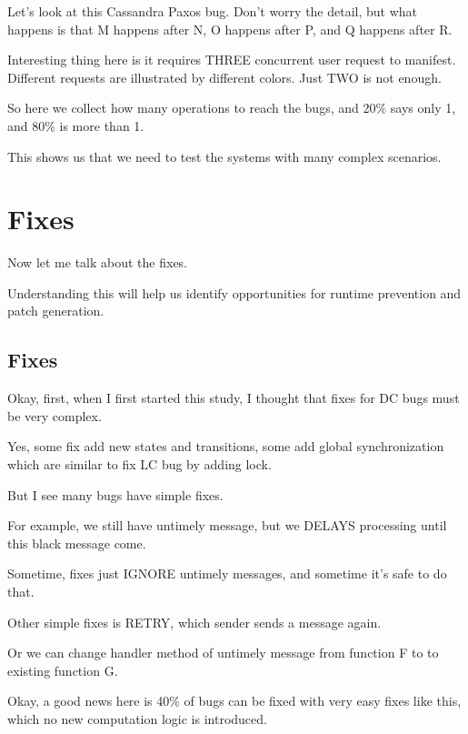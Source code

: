 
Let's look at this Cassandra Paxos bug. Don't worry the detail, but what happens
is that M happens after N, O happens after P, and Q happens after R.

Interesting thing here is it requires THREE concurrent user request to manifest.
Different requests are illustrated by different colors. Just TWO is not enough. 

So here we collect how many operations to reach the bugs, and 20\% says only 1,
and 80\% is more than 1.


This shows us that we need to test the systems with many complex scenarios.


\section{Fixes}


Now let me talk about the fixes.

Understanding this will help us identify opportunities for runtime prevention
and patch generation.

\subsection{Fixes}

Okay, first, when I first started this study, I thought that fixes for DC bugs
must be very complex. 

Yes, some fix add new states and transitions, some add global synchronization
which are similar to fix LC bug by adding lock.

But I see many bugs have simple fixes.

For example, we still have untimely message, but we DELAYS processing until this
black message come. 


Sometime, fixes just IGNORE untimely messages, and sometime it's safe to do
that.

Other simple fixes is RETRY, which sender sends a message again. 

Or we can change handler method of untimely message from function F to to
existing function G.


Okay, a good news here is 40\% of bugs can be fixed with very easy fixes like
this, which no new computation logic is introduced.

